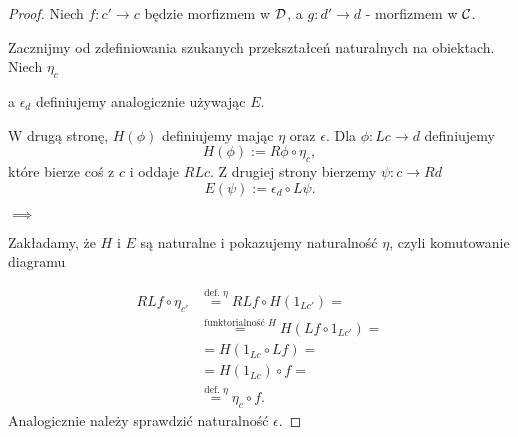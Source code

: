 \begin{proof}
  Niech $f:c'\to c$ będzie morfizmem w $\mathcal{D}$, a $g:d'\to d$ - morfizmem w $\mathcal{C}$.

  Zacznijmy od zdefiniowania szukanych przekształceń naturalnych na obiektach. Niech $\eta_c$
  \begin{center}
  \end{center}
  a $\epsilon_d$ definiujemy analogicznie używając $E$.

  W drugą stronę, $H(\phi)$ definiujemy mając $\eta$ oraz $\epsilon$. Dla $\phi:Lc\to d$ definiujemy
  $$H(\phi):=R\phi\circ\eta_c,$$
  które bierze coś z $c$ i oddaje $RLc$. Z drugiej strony bierzemy $\psi: c\to Rd$
  $$E(\psi):=\epsilon_{d}\circ L\psi.$$

  $\implies$

  Zakładamy, że $H$ i $E$ są naturalne i pokazujemy naturalność $\eta$, czyli komutowanie diagramu
  \begin{center}
  \end{center}

  \begin{align*}
    RLf\circ \eta_{c'}&\overset{\text{def. }\eta}{=}RLf\circ H(1_{Lc'})=\\ 
                      &\overset{\text{funktorialność }H}{=}H(Lf\circ 1_{Lc'})=\\ 
                      &= H(1_{Lc}\circ Lf)=\\ 
                      &=H(1_{Lc})\circ f=\\ 
                      &\overset{\text{def. }\eta}{=}\eta_c\circ f.
  \end{align*}
  Analogicznie należy sprawdzić naturalność $\epsilon$.


\end{proof}
